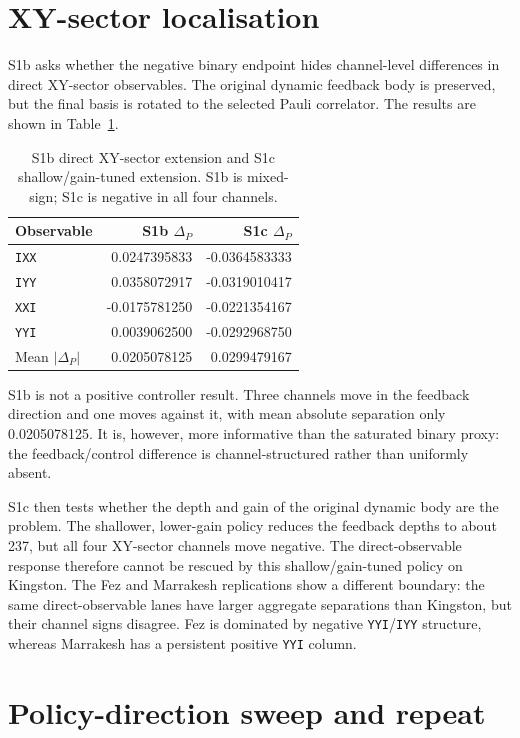 \documentclass[preprint,aps,physrev,superscriptaddress,floatfix,longbibliography]{revtex4-2}
\begin{document}
\section{XY-sector localisation}

S1b asks whether the negative binary endpoint hides channel-level differences
in direct XY-sector observables. The original dynamic feedback body is
preserved, but the final basis is rotated to the selected Pauli correlator.
The results are shown in Table~\ref{tab:s1bc}.

\begin{table}[tb]
\centering
\begin{tabular}{lrr}
\toprule
Observable & S1b $\Delta_P$ & S1c $\Delta_P$ \\
\midrule
\texttt{IXX} & 0.0247395833 & -0.0364583333 \\
\texttt{IYY} & 0.0358072917 & -0.0319010417 \\
\texttt{XXI} & -0.0175781250 & -0.0221354167 \\
\texttt{YYI} & 0.0039062500 & -0.0292968750 \\
\midrule
Mean $|\Delta_P|$ & 0.0205078125 & 0.0299479167 \\
\bottomrule
\end{tabular}
\caption{S1b direct XY-sector extension and S1c shallow/gain-tuned extension.
S1b is mixed-sign; S1c is negative in all four channels.}
\label{tab:s1bc}
\end{table}

S1b is not a positive controller result. Three channels move in the feedback
direction and one moves against it, with mean absolute separation only
0.0205078125. It is, however, more informative than the saturated binary
proxy: the feedback/control difference is channel-structured rather than
uniformly absent.

S1c then tests whether the depth and gain of the original dynamic body are the
problem. The shallower, lower-gain policy reduces the feedback depths to about
237, but all four XY-sector channels move negative. The direct-observable
response therefore cannot be rescued by this shallow/gain-tuned policy on
Kingston. The Fez and Marrakesh replications show a different boundary: the
same direct-observable lanes have larger aggregate separations than Kingston,
but their channel signs disagree. Fez is dominated by negative
\texttt{YYI}/\texttt{IYY} structure, whereas Marrakesh has a persistent
positive \texttt{YYI} column.

\section{Policy-direction sweep and repeat}
\end{document}
